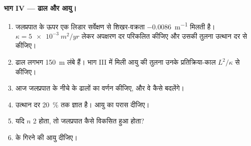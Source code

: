 \begin{problem}
\medskip\noindent\textbf{भाग IV --- ढाल और आयु।}
\begin{enumerate}[resume]
\item जलप्रपात के ऊपर एक लिडार सर्वेक्षण से शिखर-वक्रता
  \qty{-0.0086}{m^{-1}} मिलती है। $\kappa = \qty{5e-3}{m^2/yr}$ लेकर
  अपक्षरण दर परिकलित कीजिए और उसकी तुलना उत्थान दर से कीजिए।
\item ढाल लगभग \qty{150}{m} लंबे हैं। भाग III में मिली आयु की
  तुलना उनके प्रतिक्रिया-काल $L^2/\kappa$ से कीजिए।
\item आज जलप्रपात के नीचे के ढालों का वर्णन कीजिए,
  और वे कैसे बदलेंगे।
\item उत्थान दर \qty{20}{\percent} तक ज्ञात है।
  आयु का परास दीजिए।
\item यदि $n$ 2 होता, तो जलप्रपात कैसे विकसित हुआ होता?
\item {} के गिरने की आयु दीजिए।
\end{enumerate}
\end{problem}
